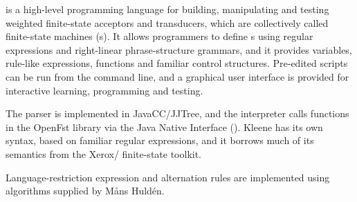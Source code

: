 \Kleene{} is a high-level programming language for building,
manipulating and testing weighted 
finite-state acceptors and transducers, which are collectively called
finite-state machines (\fsm{}s).
It allows programmers to define \fsm{}s using regular expressions and
right-linear phrase-structure grammars, and it provides variables,
rule-like expressions, functions and familiar
control structures.  Pre-edited \Kleene{}
scripts can be run from the command line, and a graphical user
interface is provided for interactive learning, programming and testing.

The \Kleene{} parser is implemented in JavaCC/JJTree, and the
interpreter calls functions in the OpenFst library via the Java
Native Interface ().  Kleene has its own syntax, based on
familiar regular expressions, and it borrows much of its semantics from
the Xerox/ finite-state toolkit.

Language-restriction expression and alternation rules are implemented using
algorithms supplied by M\r{a}ns Huld\'en. 

